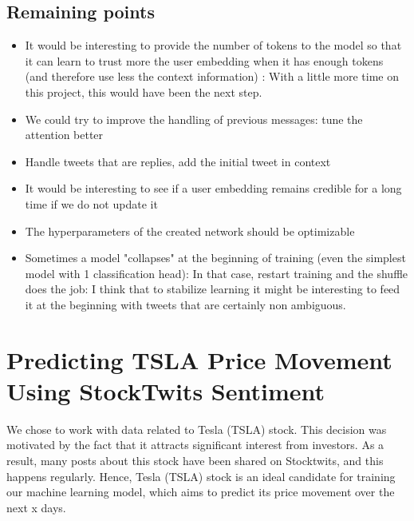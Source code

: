 \documentclass{article}
\begin{document}
\subsection{Remaining points}

\begin{itemize}
\item  It would be interesting to provide the number of tokens to the model so that it can learn to trust more the user embedding when it has enough tokens (and therefore use less the context information) : With a little more time on this project, this would have been the next step.
\item  We could try to improve the handling of previous messages: tune the attention better
\item  Handle tweets that are replies, add the initial tweet in context
\item  It would be interesting to see if a user embedding remains credible for a long time if we do not update it 
\item  The hyperparameters of the created network should be optimizable 
\item  Sometimes a model "collapses" at the beginning of training (even the simplest model with 1 classification head):
In that case, restart training and the shuffle does the job: I think that to stabilize learning it might be interesting to feed it at the beginning with tweets that are certainly non ambiguous.
\end{itemize}


\section{Predicting TSLA Price Movement Using StockTwits Sentiment}
We chose to work with data related to Tesla (TSLA) stock. This decision was motivated by the fact that it attracts significant interest from investors. As a result, many posts about this stock have been shared on Stocktwits, and this happens regularly. Hence, Tesla (TSLA) stock is an ideal candidate for training our machine learning model, which aims to predict its price movement over the next x days.
\end{document}
